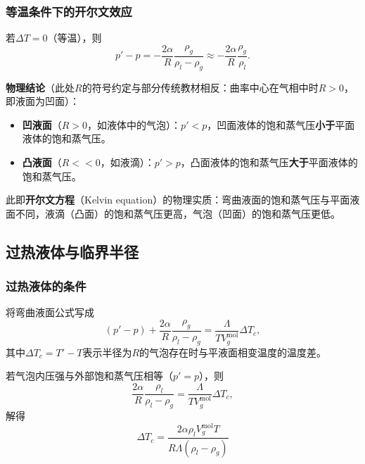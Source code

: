 \documentclass[UTF8]{ctexart}
\theoremstyle{definition}
\begin{document}
\subsubsection*{等温条件下的开尔文效应}

若$\Delta T=0$（等温），则
\begin{equation}
p'-p=-\frac{2\alpha}{R}\frac{\rho_g}{\rho_l-\rho_g}\approx-\frac{2\alpha}{R}\frac{\rho_g}{\rho_l}.
\end{equation}

\textbf{物理结论}（此处$R$的符号约定与部分传统教材相反：曲率中心在气相中时$R>0$，即液面为凹面）：
\begin{itemize}
\item \textbf{凹液面}（$R>0$，如液体中的气泡）：$p'<p$，凹面液体的饱和蒸气压\textbf{小于}平面液体的饱和蒸气压。
\item \textbf{凸液面}（$R<<0$，如液滴）：$p'>p$，凸面液体的饱和蒸气压\textbf{大于}平面液体的饱和蒸气压。
\end{itemize}

此即\textbf{开尔文方程}（Kelvin equation）的物理实质：弯曲液面的饱和蒸气压与平面液面不同，液滴（凸面）的饱和蒸气压更高，气泡（凹面）的饱和蒸气压更低。

\subsection{过热液体与临界半径}

\subsubsection*{过热液体的条件}

将弯曲液面公式写成
\begin{equation}
(p'-p)+\frac{2\alpha}{R}\frac{\rho_g}{\rho_l-\rho_g}=\frac{\Lambda}{TV_g^{\mathrm{mol}}}\Delta T_c,
\end{equation}
其中$\Delta T_c=T'-T$表示半径为$R$的气泡存在时与平液面相变温度的温度差。

若气泡内压强与外部饱和蒸气压相等（$p'=p$），则
\begin{equation}
\frac{2\alpha}{R}\frac{\rho_l}{\rho_l-\rho_g}=\frac{\Lambda}{TV_g^{\mathrm{mol}}}\Delta T_c,
\end{equation}
解得
\begin{equation}
\boxed{\Delta T_c=\frac{2\alpha\rho_l V_g^{\mathrm{mol}}T}{R\Lambda(\rho_l-\rho_g)}}
\end{equation}
\end{document}
